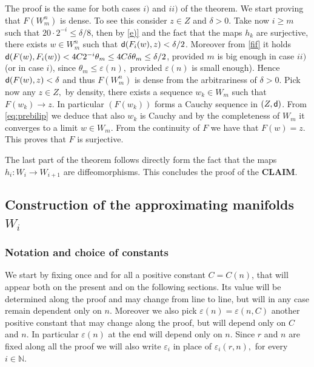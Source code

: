 \documentclass[11pt]{article}
\newcommand{\eps}{\varepsilon}
\newcommand{\sfd}{{\sf d}}
\theoremstyle{plain}
\theoremstyle{definition}
\numberwithin{equation}{section}
\begin{document}
 The proof is the same for both cases $i)$ and $ii)$ of the theorem.	We start proving that $F(W_m^n)$ is dense. To see this consider $z \in Z$ and $\delta>0.$ 
Take now $i\ge m$ such that $20\cdot 2^{-i}\le \delta/8$, then by \ref{e)} and the fact that the maps $h_k$ are surjective, there exists $w \in W_m^n$ such that $\sfd(F_i(w),z)< \delta/2$. Moreover from \eqref{fif} it holds $\sfd(F(w),F_i(w))<  4C2^{-i}\theta_m\le  4C\delta \theta_m\le  \delta/2$, provided $m$ is big enough in case $ii)$ (or in case $i)$, since $\theta_m\le \eps(n),$ provided $\eps(n)$ is small enough). Hence $\sfd(F(w),z)<  \delta$ and thus $F(W_m^n)$ is dense from the arbitrariness of $\delta>0$. Pick now any $z \in Z,$ by density, there exists a sequence $w_k \in W_m$ such that $F(w_k)\to z$. In particular $(F(w_k))$ forms a Cauchy sequence in $(Z,\sfd)$. From \eqref{eq:prebilip} we deduce that also $w_k$ is Cauchy  and by the completeness of $W_m$ it converges to a limit $w\in W_m$. From the continuity of $F$ we have that $F(w)=z$. This proves that $F$ is surjective.  

\medskip

The last part of the theorem follows directly form the fact that the maps $h_i: W_i \to W_{i+1}$ are diffeomorphisms.
This concludes the proof of the {\bf CLAIM}. \\



\subsection{Construction of the approximating manifolds \texorpdfstring{$W_i$}{Wi}}\label{sec:manifolds}


\subsubsection{Notation and choice of constants}\label{sec:notations reif}
We start by fixing once and for all a positive constant $C=C(n)$, that will appear both on the present and on the following sections. Its value will be determined along the proof and may change from line to line, but will in any case remain dependent only on $n$.
Moreover we  also pick  $\eps(n)=\eps(n,C)$ another positive constant that may change along the proof, but will depend only on $C$ and $n$. In particular $\eps(n)$ at the end will depend only on $n$. Since $r$ and $n$ are fixed along all the proof we will also write $\eps_i$ in place of $\eps_i(r,n),$ for every $i \in \mathbb{N}.$ 
\end{document}
